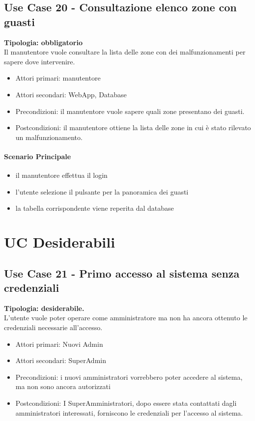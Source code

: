 \documentclass[12pt]{article}
\begin{document}
\subsection{Use Case 20 - Consultazione elenco zone con guasti}
\textbf{Tipologia: obbligatorio}\\
Il manutentore vuole consultare la lista delle zone con dei malfunzionamenti per sapere dove intervenire.
\begin{itemize}
	\item Attori primari: manutentore
	\item Attori secondari: WebApp, Database
	\item Precondizioni: il manutentore vuole sapere quali zone presentano dei guasti.\\
	\item Postcondizioni: il manutentore ottiene la lista delle zone in cui è stato rilevato un malfunzionamento.
\end{itemize}
\paragraph{Scenario Principale}
\begin{itemize}
	\item il manutentore effettua il login
	\item l'utente selezione il pulsante per la panoramica dei guasti
	\item la tabella corrispondente viene reperita dal database
\end{itemize}


\section{UC Desiderabili}

\subsection{Use Case 21 - Primo accesso al sistema senza credenziali}
\textbf{Tipologia: desiderabile.} \\
L'utente vuole poter operare come amministratore ma non ha ancora ottenuto le credenziali necessarie all'accesso.
\begin{itemize}
	\item Attori primari: Nuovi Admin
	\item Attori secondari: SuperAdmin
	\item Precondizioni: i nuovi amministratori vorrebbero poter accedere al sistema, ma non sono ancora autorizzati
	\item Postcondizioni: I SuperAmministratori, dopo essere stata contattati dagli amministratori interessati, forniscono le credenziali per l'accesso al sistema.
\end{itemize}
\end{document}
